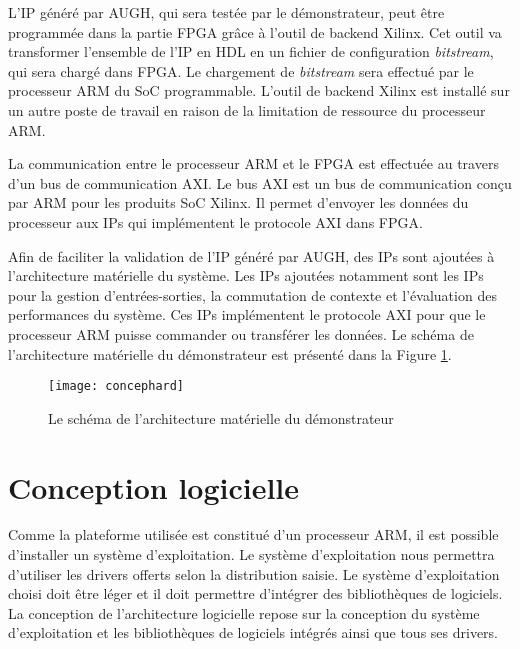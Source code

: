 L'IP généré par AUGH, qui sera testée par le démonstrateur, peut être programmée dans la partie FPGA grâce à l'outil de backend Xilinx.
Cet outil va transformer l'ensemble de l'IP en HDL en un fichier de configuration \emph{bitstream}, qui sera
chargé dans FPGA. Le chargement de \emph{bitstream} sera effectué par le processeur ARM du SoC programmable.
L'outil de backend Xilinx est installé sur un autre poste de travail en raison de la limitation de ressource du processeur ARM.

La communication entre le processeur ARM et le FPGA est effectuée au travers d'un bus de communication AXI.
Le bus AXI est un bus de communication conçu par ARM pour les produits SoC Xilinx. 
Il permet d'envoyer les données du processeur aux IPs qui implémentent le protocole AXI dans FPGA.

Afin de faciliter la validation de l'IP généré par AUGH, des IPs sont ajoutées à l'architecture matérielle du système.
Les IPs ajoutées notamment sont les IPs pour la gestion d'entrées-sorties, la commutation de contexte et l'évaluation
des performances du système. Ces IPs implémentent le protocole AXI pour que le processeur ARM puisse
commander ou transférer les données.
Le schéma de l'architecture matérielle du démonstrateur est présenté
dans la Figure \ref{fig:concephard}.

\begin{figure}[h]
	\centering
	\texttt{[image: concephard]}
	\caption{Le schéma de l'architecture matérielle du démonstrateur}
	\label{fig:concephard}
	\vspace{-2mm}
\end{figure}

\section{Conception logicielle}
\label{sec:concepsoft}

Comme la plateforme utilisée est constitué d'un processeur ARM, il est possible d'installer un système d'exploitation.
Le système d'exploitation nous permettra d'utiliser les drivers offerts selon la distribution saisie. 
Le système d'exploitation choisi doit être léger et il doit permettre d'intégrer des bibliothèques de logiciels.
La conception de l'architecture logicielle repose sur la conception du système d'exploitation et les
bibliothèques de logiciels intégrés ainsi que tous ses drivers. 

